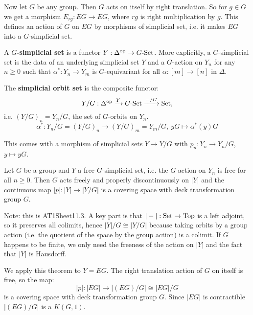 Now let $G$ be any group. Then $G$ acts on itself by right translation. So for $g\in G$ we get a morphism $E_{rg}:EG\to EG$, where $rg$ is right multiplication by $g$. This defines an action of $G$ on $EG$ by morphisms of simplicial set, i.e. it makes $EG$ into a $G$-simplicial set.

A \textbf{$G$-simplicial set} is a functor $Y:\Delta^{\operatorname{op}}\to G\text{-}{\mathrm{Set}}$. More explicitly, a $G$-simplicial set is the data of an underlying simplicial set $Y$ and a $G$-action on $Y_n$ for any $n\geq0$ such that $\alpha^*:Y_n\to Y_m$ is $G$-equivariant for all $\alpha:[m]\to[n]$ in $\Delta$.

The \textbf{simplicial orbit set} is the composite functor:
\[Y/G:\Delta^{\operatorname{op}}\xrightarrow{Y}G\text{-Set}\xrightarrow{-/G}{\mathrm{Set}},\]
i.e. $(Y/G)_n=Y_n/G$, the set of $G$-orbits on $Y_n$.
\[\alpha^*:Y_n/G=(Y/G)_n\to(Y/G)_m=Y_m/G,\ yG\mapsto\alpha^*(y)G\]

This comes with a morphism of simplicial sets $Y\to Y/G$ with $p_n:Y_n\to Y_n/G$, $y\mapsto yG$.

\begin{theorem}
Let $G$ be a group and $Y$ a free $G$-simplicial set, i.e. the $G$ action on $Y_n$ is free for all $n\geq0$. Then $G$ acts freely and properly discontinuously on $|Y|$ and the continuous map $|p|:|Y|\to|Y/G|$ is a covering space with deck transformation group $G$.
\end{theorem}

Note: this is AT1Sheet11.3. A key part is that $|-|:{\mathrm{Set}}\to{\mathrm{Top}}$ is a left adjoint, so it preserves all colimits, hence $|Y|/G\cong|Y/G|$ because taking orbits by a group action (i.e. the quotient of the space by the group action) is a colimit. If $G$ happens to be finite, we only need the freeness of the action on $|Y|$ and the fact that $|Y|$ is Hausdorff.

We apply this theorem to $Y=EG$. The right translation action of $G$ on itself is free, so the map:
\[|p|:|EG|\to|(EG)/G|\cong|EG|/G\]
is a covering space with deck transformation group $G$. Since $|EG|$ is contractible $|(EG)/G|$ is a $K(G,1)$.

